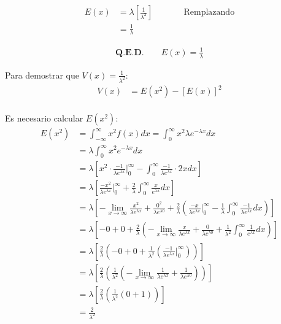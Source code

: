 \documentclass{templateNote}
\begin{document}
\begin{align*}
    E(x) &= \lambda \left[\frac{1}{\lambda^2}\right] && \qquad \text{Remplazando}\\
    &= \displaystyle \frac{1}{\lambda}
\end{align*}

\begin{align*}
    \textbf{Q.E.D.} \qquad E(x) = \displaystyle \frac{1}{\lambda}
\end{align*}

\newpage
Para demostrar que $V(x) = \displaystyle \frac{1}{\lambda^2}$:
\begin{align*}
    V(x) &= E(x^2) - [E(x)]^2 \\
\end{align*}

Es necesario calcular $E(x^2)$:
\begin{align*}
    E(x^2) &= \int_{- \infty}^{\infty} x^2 f(x) dx = \int_{0}^{\infty} x^2 \lambda e^{- \lambda x} dx \\
    &= \lambda \int_{0}^{\infty} x^2 e^{- \lambda x} dx \\
    &= \lambda \left[x^2 \cdot \frac{-1}{\lambda e^{\lambda x}} \Big|_{0}^{\infty} - \int_{0}^{\infty}{\frac{-1}{\lambda e^{\lambda x}}\cdot 2x dx}\right] \\
    &= \lambda \left[\frac{-x^2}{\lambda e^{\lambda x}} \Big|_{0}^{\infty} + \frac{2}{\lambda} \int_{0}^{\infty}{\frac{x}{e^{\lambda x}}dx}\right] \\
    &= \lambda \left[- \lim_{x \to \infty}{\frac{x^2}{\lambda e^{\lambda x}}} + \frac{0^2}{\lambda e^{\lambda 0}} + \frac{2}{\lambda} \left(\frac{-x}{\lambda e^{\lambda x}} \Big|_{0}^{\infty} - \frac{1}{\lambda} \int_{0}^{\infty}{\frac{-1}{\lambda e^{\lambda x}}dx}\right)\right] \\
    &= \lambda \left[- 0 + 0 + \frac{2}{\lambda} \left(- \lim_{x \to \infty}{\frac{x}{\lambda e^{\lambda x}}} + \frac{0}{\lambda e^{\lambda 0}}+ \frac{1}{\lambda^2} \int_{0}^{\infty}{\frac{1}{e^{\lambda x}}dx}\right)\right] \\
    &= \lambda \left[\frac{2}{\lambda} \left(- 0 + 0 + \frac{1}{\lambda^2} \left(\frac{-1}{\lambda e^{\lambda x}} \Big|_{0}^{\infty}\right)\right)\right] \\
    &= \lambda \left[\frac{2}{\lambda} \left(\frac{1}{\lambda^2} \left(- \lim_{x \to \infty}{\frac{1}{\lambda e^{\lambda x}}} + \frac{1}{\lambda e^{\lambda 0}}\right)\right)\right] \\
    &= \lambda \left[\frac{2}{\lambda} \left(\frac{1}{\lambda^2} \left(0 + 1\right)\right)\right] \\
    &= \frac{2}{\lambda^2}
\end{align*}
\end{document}
